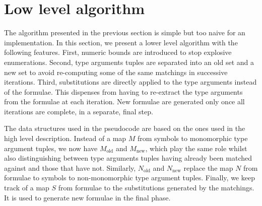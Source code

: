 \documentclass[runningheads]{llncs}
\begin{document}
\section{Low level algorithm}
\label{sec:low-level-algorithm}

The algorithm presented in the previous section is simple but too naive for an implementation. In this section, we present a lower level algorithm with the following features.
First, numeric bounds are introduced to stop explosive enumerations.
Second, type arguments tuples are separated into an old set and a new set to avoid re-computing some of the same matchings in successive iterations.
Third, substitutions are directly applied to the type arguments instead of the formulae. This dispenses from having to re-extract the type arguments from the formulae at each iteration. New formulae are generated only once all iterations are complete, in a separate, final step.

The data structures used in the pseudocode are based on the ones used in the high level description. Instead of a map \(M\) from symbols to monomorphic type argument tuples, we now have \(M_\text{old}\) and \(M_\text{new}\), which play the same role whilst also distinguishing between type arguments tuples having already been matched against and those that have not. Similarly, \(N_\text{old}\) and \(N_\text{new}\) replace the map \(N\) from formulae to symbols to non-monomorphic type argument tuples. Finally, we keep track of a map \(S\) from formulae to the substitutions generated by the matchings. It is used to generate new formulae in the final phase.
\end{document}
